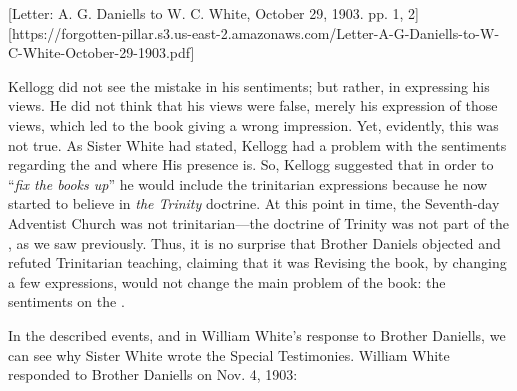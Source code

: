 
[Letter: A. G. Daniells to W. C. White, October 29, 1903. pp. 1, 2][https://forgotten-pillar.s3.us-east-2.amazonaws.com/Letter-A-G-Daniells-to-W-C-White-October-29-1903.pdf]

Kellogg did not see the mistake in his sentiments; but rather, in expressing his views. He did not think that his views were false, merely his expression of those views, which led to the book giving a wrong impression. Yet, evidently, this was not true. As Sister White had stated, Kellogg had a problem with the sentiments regarding the  and where His presence is. So, Kellogg suggested that in order to “\textit{fix the books up}” he would include the trinitarian expressions because he now started to believe in \textit{the Trinity} doctrine. At this point in time, the Seventh-day Adventist Church was not trinitarian—the doctrine of Trinity was not part of the , as we saw previously. Thus, it is no surprise that Brother Daniels objected and refuted Trinitarian teaching, claiming that it was Revising the book, by changing a few expressions, would not change the main problem of the book: the sentiments on the . 

In the described events, and in William White's response to Brother Daniells, we can see why Sister White wrote the Special Testimonies. William White responded to Brother Daniells on Nov. 4, 1903:




